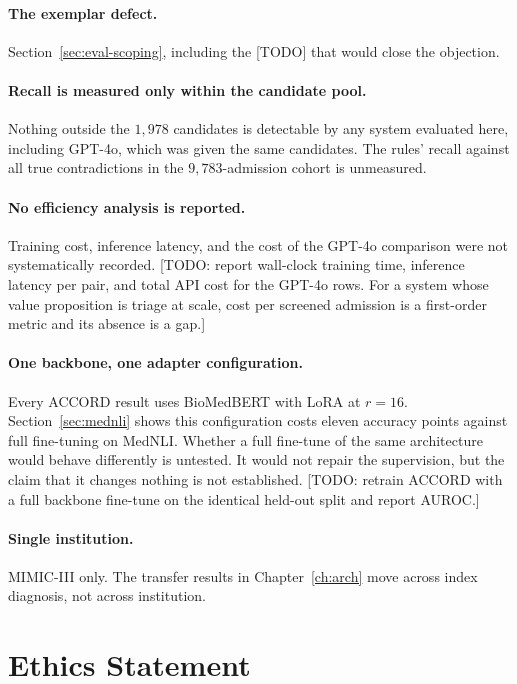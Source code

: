 \paragraph{The exemplar defect.} Section~\ref{sec:eval-scoping}, including the
[TODO] that would close the objection.

\paragraph{Recall is measured only within the candidate pool.} Nothing outside
the $1{,}978$ candidates is detectable by any system evaluated here, including
GPT-4o, which was given the same candidates. The rules' recall against all true
contradictions in the $9{,}783$-admission cohort is unmeasured.

\paragraph{No efficiency analysis is reported.} Training cost, inference
latency, and the cost of the GPT-4o comparison were not systematically recorded.
[TODO: report wall-clock training time, inference latency per pair, and total
API cost for the GPT-4o rows. For a system whose value proposition is triage at
scale, cost per screened admission is a first-order metric and its absence is a
gap.]

\paragraph{One backbone, one adapter configuration.} Every ACCORD result uses
BioMedBERT with LoRA at $r = 16$. Section~\ref{sec:mednli} shows this
configuration costs eleven accuracy points against full fine-tuning on MedNLI.
Whether a full fine-tune of the same architecture would behave differently is
untested. It would not repair the supervision, but the claim that it changes
nothing is not established. [TODO: retrain ACCORD with a full backbone
fine-tune on the identical held-out split and report AUROC.]

\paragraph{Single institution.} MIMIC-III only. The transfer results in
Chapter~\ref{ch:arch} move across index diagnosis, not across institution.

\section{Ethics Statement}
\label{sec:eval-ethics}

